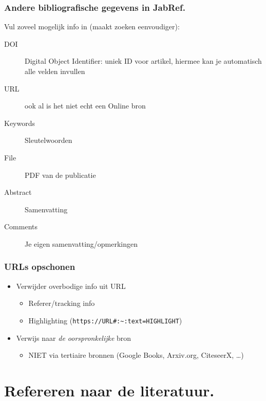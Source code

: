 \documentclass[aspectratio=169]{beamer}
\begin{document}
\begin{frame}
  \frametitle{Andere bibliografische gegevens in JabRef.}

  Vul zoveel mogelijk info in (maakt zoeken eenvoudiger):

  \begin{description}
    \item[DOI] Digital Object Identifier: uniek ID voor artikel, hiermee kan je automatisch alle velden invullen
    \item[URL] ook al is het niet echt een Online bron
    \item[Keywords] Sleutelwoorden
    \item[File] PDF van de publicatie
    \item[Abstract] Samenvatting
    \item[Comments] Je eigen samenvatting/opmerkingen
  \end{description}

\end{frame}

\begin{frame}[fragile]
  \frametitle{URLs opschonen}

  \begin{itemize}
    \item Verwijder overbodige info uit URL
      \begin{itemize}
        \item Referer/tracking info
        \item Highlighting (\verb+https://URL#:~:text=HIGHLIGHT+)
      \end{itemize}
    \item Verwijs naar \textit{de oorspronkelijke} bron
      \begin{itemize}
        \item NIET via tertiaire bronnen (Google Books, Arxiv.org, CiteseerX, \ldots)
      \end{itemize}
  \end{itemize}

\end{frame}

\section{Refereren naar de literatuur.}
\end{document}
